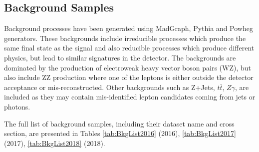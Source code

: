 \subsection{Background Samples}

Background processes have been generated using MadGraph, Pythia and Powheg
generators. These backgrounds include irreducible processes which produce the
same final state as the signal and also reducible processes which produce
different physics, but lead to similar signatures in the detector. The backgrounds
are dominated by the production of electroweak heavy vector boson pairs (WZ), but
also include ZZ production where one of the leptons is either outside the detector
acceptance or mis-reconstructed. Other backgrounds such as Z+Jets, $t\bar{t}$,
$Z\gamma$, are included as they may contain mis-identified lepton candidates
coming from jets or photons.

The full list of background samples, including their dataset name and cross
section, are presented in Tables \ref{tab:BkgList2016} (2016),
\ref{tab:BkgList2017}(2017), \ref{tab:BkgList2018} (2018).

